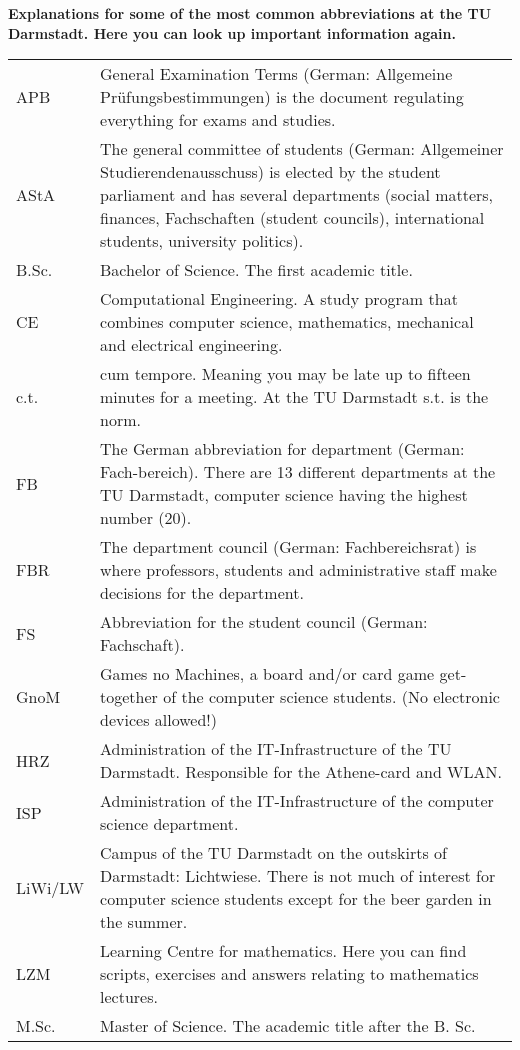 
\textbf{Explanations for some of the most common abbreviations at the TU Darmstadt. Here you can look up important information again.}

\begin{longtable}{p{20mm}p{85mm}}
APB		&	General Examination Terms (German: Allgemeine Prüfungsbestimmungen) is the document regulating everything for exams and studies.\\
AStA	&	The general committee of students (German: Allgemeiner Studierendenausschuss) is elected by the student parliament and has several departments (social matters, finances, Fachschaften (student councils), international students, university politics).\\
B.Sc.	&	Bachelor of Science. The first academic title.\\
CE		&	Computational Engineering. A study program that combines computer science, mathematics, mechanical and electrical engineering.\\
c.t.	&	cum tempore. Meaning you may be late up to fifteen minutes for a meeting. At the TU Darmstadt s.t. is the norm.\\
FB		&	The German abbreviation for department (German: Fach-bereich). There are 13 different departments at the TU Darmstadt, computer science having the highest number (20).\\
FBR		&	The department council (German: Fachbereichsrat) is where professors, students and administrative staff make decisions for the department.\\
FS		&	Abbreviation for the student council (German: Fachschaft).\\
GnoM	&	Games no Machines, a board and/or card game get-together of the computer science students. (No electronic devices allowed!)\\
HRZ		&	Administration of the IT-Infrastructure of the TU Darmstadt. Responsible for the Athene-card and WLAN.\\
ISP		&	Administration of the IT-Infrastructure of the computer science department.\\
LiWi/LW	&	Campus of the TU Darmstadt on the outskirts of Darmstadt: Lichtwiese. There is not much of interest for computer science students except for the beer garden in the summer.\\
LZM		&	Learning Centre for mathematics. Here you can find scripts, exercises and answers relating to mathematics lectures.\\
M.Sc.	&	Master of Science. The academic title after the B. Sc.\\

\end{longtable}
